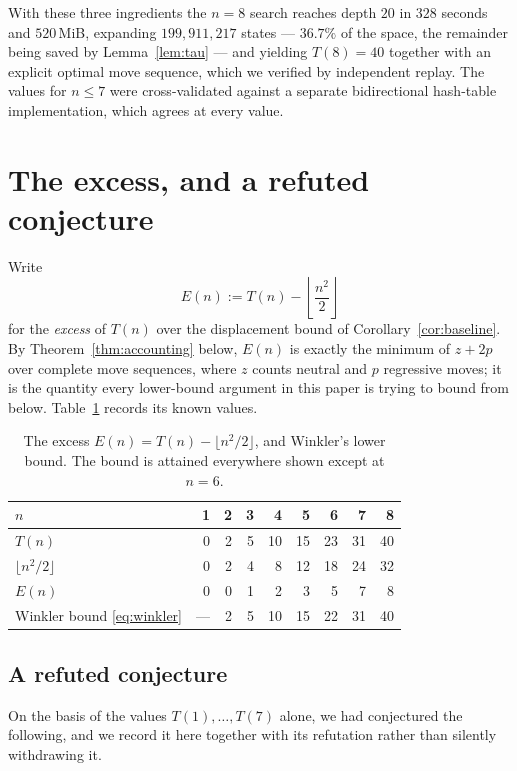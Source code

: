 \documentclass[11pt]{amsart}
\theoremstyle{plain}
\theoremstyle{definition}
\theoremstyle{remark}
\begin{document}
With these three ingredients the $n=8$ search reaches depth $20$ in $328$ seconds and $520$\,MiB, expanding $199{,}911{,}217$ states --- $36.7\%$ of the space, the remainder being saved by Lemma~\ref{lem:tau} --- and yielding $T(8)=40$ together with an explicit optimal move sequence, which we verified by independent replay. The values for $n\le 7$ were cross-validated against a separate bidirectional hash-table implementation, which agrees at every value.

\section{The excess, and a refuted conjecture}
\label{sec:formula}

Write
\[
E(n) := T(n) - \left\lfloor\frac{n^2}{2}\right\rfloor
\]
for the \emph{excess} of $T(n)$ over the displacement bound of Corollary~\ref{cor:baseline}. By Theorem~\ref{thm:accounting} below, $E(n)$ is exactly the minimum of $z+2p$ over complete move sequences, where $z$ counts neutral and $p$ regressive moves; it is the quantity every lower-bound argument in this paper is trying to bound from below. Table~\ref{tab:excess} records its known values.

\begin{table}[h]
\centering
\begin{tabular}{@{}lrrrrrrrr@{}}
\toprule
$n$ & 1 & 2 & 3 & 4 & 5 & 6 & 7 & 8 \\
\midrule
$T(n)$ & 0 & 2 & 5 & 10 & 15 & 23 & 31 & 40 \\
$\lfloor n^2/2\rfloor$ & 0 & 2 & 4 & 8 & 12 & 18 & 24 & 32 \\
$E(n)$ & 0 & 0 & 1 & 2 & 3 & 5 & 7 & 8 \\
Winkler bound \eqref{eq:winkler} & --- & 2 & 5 & 10 & 15 & 22 & 31 & 40 \\
\bottomrule
\end{tabular}
\caption{The excess $E(n)=T(n)-\lfloor n^2/2\rfloor$, and Winkler's lower bound. The bound is attained everywhere shown except at $n=6$.}
\label{tab:excess}
\end{table}

\subsection{A refuted conjecture}
\label{sec:refuted}

On the basis of the values $T(1),\dots,T(7)$ alone, we had conjectured the following, and we record it here together with its refutation rather than silently withdrawing it.
\end{document}
